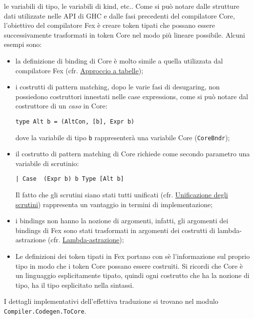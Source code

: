 \documentclass[10pt,a4paper]{article}
\begin{document}
le variabili di tipo, le variabili di kind, etc.. Come si può notare dalle strutture dati utilizzate nelle API di GHC e
dalle fasi precedenti del compilatore Core, l'obiettivo del compilatore Fex è creare token tipati che possano essere
successivamente trasformati in token Core nel modo più lineare possibile. Alcuni esempi sono:
\begin{itemize}
    \item la definizione di binding di Core è molto simile a quella utilizzata dal compilatore Fex (cfr.
    \hyperlink{Approccio a tabelle}{Approccio a tabelle});
    \item i costrutti di pattern matching, dopo le varie fasi di desugaring, non possiedono costruttori innestati nelle
    case expressions, come si può notare dal costruttore di un \textit{caso} in Core:
    \begin{lstlisting}
type Alt b = (AltCon, [b], Expr b)
    \end{lstlisting}
    dove la variabile di tipo \texttt{b} rappresenterà una variabile Core (\texttt{CoreBndr});
    \item il costrutto di pattern matching di Core richiede come secondo parametro una variabile di scrutinio:
    \begin{lstlisting}
| Case  (Expr b) b Type [Alt b]
    \end{lstlisting}
    Il fatto che gli scrutini siano stati tutti unificati
    (cfr. \hyperlink{Unificazione degli scrutini}{Unificazione degli scrutini}) rappresenta un vantaggio in termini di
    implementazione;
    \item i bindings non hanno la nozione di argomenti, infatti, gli argomenti dei bindings di Fex sono stati
    trasformati in argomenti dei costrutti di lambda-astrazione (cfr. \hyperlink{Lambda-astrazione}{Lambda-astrazione});
    \item Le definizioni dei token tipati in Fex portano con sè l'informazione sul proprio tipo in modo che i token
    Core possano essere costruiti. Si ricordi che Core è un linguaggio esplicitamente tipato, quindi ogni costrutto che
    ha la nozione di tipo, ha il tipo esplicitato nella sintassi.
\end{itemize}
I dettagli implementativi dell'effettiva traduzione si trovano nel modulo \texttt{Compiler.Codegen.ToCore}.
\end{document}
